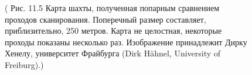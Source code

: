 \documentclass[10pt,a4paper]{article}
\begin{document}
\begin{figure}[H]
	\caption{ ( Рис. 11.5 Карта шахты, полученная попарным сравнением проходов сканирования. Поперечный размер составляет, приблизительно, 250 метров. Карта не целостная, некоторые проходы показаны несколько раз. Изображение принадлежит Дирку Хенелу, университет Фрайбурга (Dirk Hähnel, University of Freiburg).) }
	\label{fig:115orig}
\end{figure}
\end{document}
